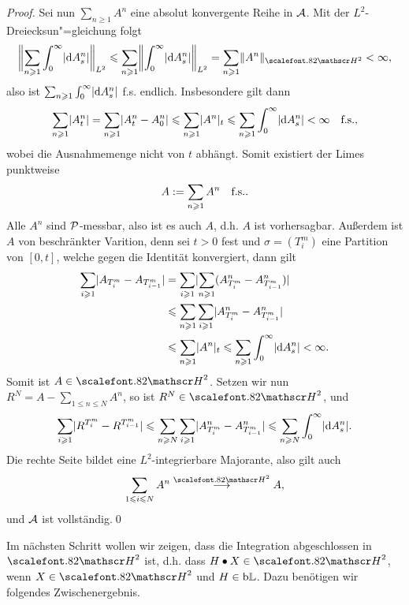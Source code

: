 \begin{proof}
Sei nun $\sum_{n\ge 1} A^n$ eine absolut konvergente Reihe in $\AA$. Mit der
$L^2$-Dreiecksun"=gleichung folgt
\begin{align*}
\biggl\|\sum_{n\ge 1} \int_0^\infty \abs{\dA_s^n}\biggr\|_{L^2} \le
\sum_{n\ge 1} \norm*{ \int_0^\infty \abs{\dA_s^n}}_{L^2} = 
\sum_{n\ge 1} \norm{A^n}_{\cH^2} < \infty,
\end{align*}
also ist $\sum_{n\ge 1} \int_0^\infty \abs{\dA_s^n}$ f.s. endlich. Insbesondere
gilt dann
\begin{align*}
\sum_{n\ge 1}\abs{A_t^n} = \sum_{n\ge 1}\abs{A_t^n-A_0^n} \le
\sum_{n\ge 1}\abs{A^n}_t \le \sum_{n\ge 1}\int_0^\infty \abs{\dA_s^n} <
\infty\quad \fs,
\end{align*}
wobei die Ausnahmemenge nicht von $t$ abhängt. Somit existiert der
Limes punktweise
\begin{align*}
A \defl \sum_{n\ge 1} A^n \quad \fs.
\end{align*}
Alle $A^n$ sind $\PP$-messbar, also ist es auch $A$, d.h. $A$ ist vorhersagbar.
Außerdem ist $A$ von beschränkter Varition, denn sei $t > 0$ fest und
$\sigma=(T_i^m)$ eine Partition von $[0,t]$, welche gegen die Identität
konvergiert, dann gilt
\begin{align*}
\sum_{i\ge 1} \abs{A_{T_{i}^m}- A_{T_{i-1}^m}}
&= \sum_{i\ge 1} \abs{\sum_{n\ge 1} (A_{T_{i}^m}^n- A_{T_{i-1}^m}^n)}\\
&\le
\sum_{n\ge 1} \sum_{i\ge 1} \abs{A_{T_{i}^m}^n- A_{T_{i-1}^m}^n}\\
&\le \sum_{n\ge 1} \abs{A^n}_t
\le \sum_{n\ge 1} \int_0^\infty \abs{\dA_s^n} < \infty. 
\end{align*}
Somit ist $A\in\cH^2$. Setzen wir nun $R^N = A-\sum_{1\le n\le N} A^n$, so ist
$R^N\in\cH^2$, und
\begin{align*}
\sum_{i\ge 1} \abs{R^{T_i^m}-R^{T_{i-1}^m}}
\le
\sum_{n\ge N}\sum_{i\ge 1} \abs{A_{T_i^m}^n-A_{T_{i-1}^m}^n}
\le
\sum_{n\ge N} \int_0^\infty \abs{\dA_s^n}.
\end{align*}
Die rechte Seite bildet eine $L^2$-integrierbare Majorante, also gilt auch
\begin{align*}
\sum_{1\le i\le N}A^n \overset{\cH^2}{\longto }A,
\end{align*}
und $\AA$ ist vollständig.\qed
\end{proof}

Im nächsten Schritt wollen wir zeigen, dass die Integration abgeschlossen in
$\cH^2$ ist, d.h. dass $H\bullet X\in\cH^2$, wenn $X\in\cH^2$ und $H\in\bL$.
Dazu benötigen wir folgendes Zwischenergebnis.

